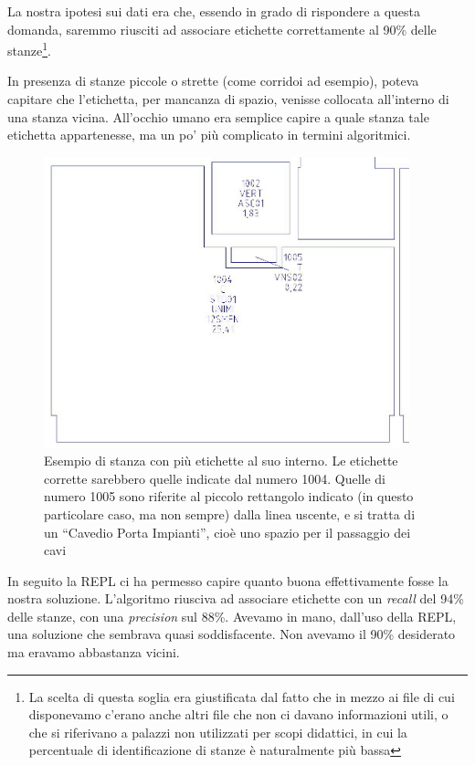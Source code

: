 \documentclass[12pt]{report}
\begin{document}
La nostra ipotesi sui dati era che, essendo in grado di rispondere a questa domanda, saremmo riusciti ad associare etichette correttamente al 90\% delle stanze\footnote{La scelta di questa soglia era giustificata dal fatto che in mezzo ai file di cui disponevamo c'erano anche altri file che non ci davano informazioni utili, o che si riferivano a palazzi non utilizzati per scopi didattici, in cui la percentuale di identificazione di stanze è naturalmente più bassa}.

In presenza di stanze piccole o strette (come corridoi ad esempio), poteva capitare che l'etichetta, per mancanza di spazio, venisse collocata all'interno di una stanza vicina. All'occhio umano era semplice capire a quale stanza tale etichetta appartenesse, ma un po' più complicato in termini algoritmici.

\begin{figure}[h]
    \centering
    \includegraphics[width=300pt]{03-dxf-stanza-etichette-fuori.jpg}
    \caption{Esempio di stanza con più etichette al suo interno. Le etichette corrette sarebbero quelle indicate dal numero 1004. Quelle di numero 1005 sono riferite al piccolo rettangolo indicato (in questo particolare caso, ma non sempre) dalla linea uscente, e si tratta di un ``Cavedio Porta Impianti'', cioè uno spazio per il passaggio dei cavi}
    \label{fig:dxf_chaos}
\end{figure}

In seguito la REPL ci ha permesso capire quanto buona effettivamente fosse la nostra soluzione. L'algoritmo riusciva ad associare etichette con un \textit{recall} del 94\% delle stanze, con una \textit{precision} sul 88\%. Avevamo in mano, dall'uso della REPL, una soluzione che sembrava quasi soddisfacente. Non avevamo il 90\% desiderato ma eravamo abbastanza vicini. 
\end{document}
